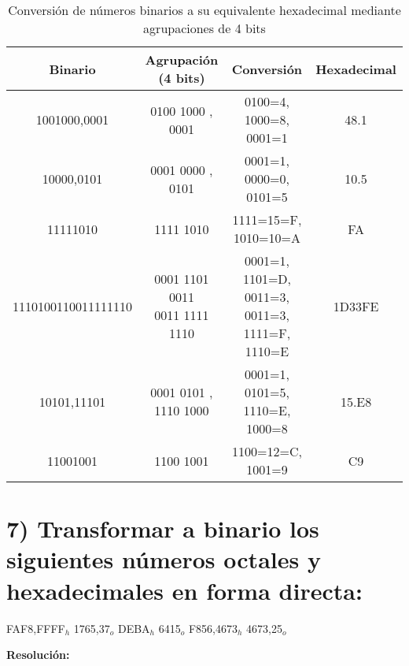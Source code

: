 \documentclass[12pt]{article}
\begin{document}
\begin{table}[H]
	\centering
	\renewcommand{\arraystretch}{1.3}
	\begin{tabular}{|c|c|c|c|}
		\hline
		\textbf{Binario} & \textbf{Agrupación (4 bits)} & \textbf{Conversión} & \textbf{Hexadecimal} \\
		\hline
		1001000,0001 & 0100 1000 , 0001 & 0100=4, 1000=8, 0001=1 & 48.1 \\
		\hline
		10000,0101 & 0001 0000 , 0101 & 0001=1, 0000=0, 0101=5 & 10.5 \\
		\hline
		11111010 & 1111 1010 & 1111=15=F, 1010=10=A & FA \\
		\hline
		1110100110011111110 & \makecell[l]{0001 1101 0011\\ 0011 1111 1110} & 
		\makecell[l]{0001=1, 1101=D, 0011=3,\\ 0011=3, 1111=F, 1110=E} & 
		1D33FE \\
		\hline
		10101,11101 & \makecell[l]{0001 0101 ,\\ 1110 1000} & 0001=1, 0101=5, 1110=E, 1000=8 & 15.E8 \\
		\hline
		11001001 & 1100 1001 & 1100=12=C, 1001=9 & C9 \\
		\hline
	\end{tabular}
	\caption{Conversión de números binarios a su equivalente hexadecimal mediante agrupaciones de 4 bits}
\end{table}

\section*{7) Transformar a binario los siguientes números octales y hexadecimales en forma directa:}

\begin{center}
FAF8{,}FFFF$_h$ \hspace{1cm} 1765{,}37$_o$ \hspace{1cm} DEBA$_h$ \hspace{1cm} 6415$_o$ \hspace{1cm} F856{,}4673$_h$ \hspace{1cm} 4673{,}25$_o$
\end{center}


\textbf{Resolución:} \\\\
\end{document}
